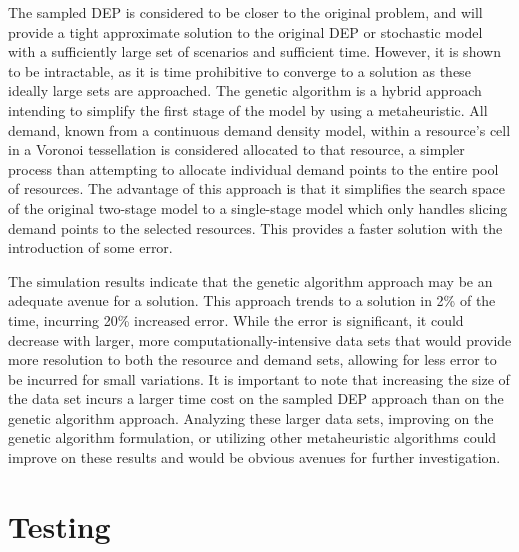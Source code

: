 \documentclass[conference]{IEEEtran}
\begin{document}
The sampled DEP is considered to be closer to the original problem, and will provide a tight approximate solution to the original DEP or stochastic model with a sufficiently large set of scenarios and sufficient time.  However, it is shown to be intractable, as it is time prohibitive to converge to a solution as these ideally large sets are approached.  The genetic algorithm is a hybrid approach intending to simplify the first stage of the model by using a metaheuristic.  All demand, known from a continuous demand density model, within a resource's cell in a Voronoi tessellation is considered allocated to that resource, a simpler process than attempting to allocate individual demand points to the entire pool of resources.  The advantage of this approach is that it simplifies the search space of the original two-stage model to a single-stage model which only handles slicing demand points to the selected resources.  This provides a faster solution with the introduction of some error.

The simulation results indicate that the genetic algorithm approach may be an adequate avenue for a solution.  This approach trends to a solution in 2\% of the time, incurring 20\% increased error.  While the error is significant, it could decrease with larger, more computationally-intensive data sets that would provide more resolution to both the resource and demand sets, allowing for less error to be incurred for small variations.  It is important to note that increasing the size of the data set incurs a larger time cost on the sampled DEP approach than on the genetic algorithm approach.  Analyzing these larger data sets, improving on the genetic algorithm formulation, or utilizing other metaheuristic algorithms could improve on these results and would be obvious avenues for further investigation.

\section{Testing}
\end{document}
